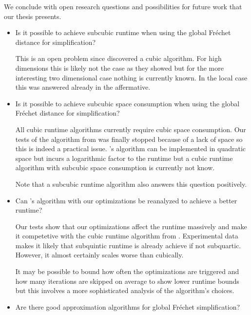 We conclude with open research questions and possibilities for future work that our thesis presents.

\begin{itemize}
  \item Is it possible to achieve subcubic runtime when using the global Fréchet distance for simplification?

	This is an open problem since \citeauthor{polyline_simplification_has_cubic_complexity_bringmannetal} discovered a cubic algorithm. For high dimensions this is likely not the case as they showed but for the more interesting two dimensional case nothing is currently known. In the local case this was answered already in the affermative.

	\item Is it possible to achieve subcubic space consumption when using the global Fréchet distance for simplification?

	All cubic runtime algorithms currently require cubic space consumption. Our tests of the algorithm from \citeauthor{polyline_simplification_has_cubic_complexity_bringmannetal} was finally stopped because of a lack of space so this is indeed a practical issue. \citeauthor{global_curve_simplification}'s algorithm can be implemented in quadratic space but incurs a logarithmic factor to the runtime but a cubic runtime algorithm with subcubic space consumption is currently not know.

	Note that a subcubic runtime algorithm also answers this question positively.

	\item Can \citeauthor{on_optimal_polyline_simplification_using_the_hausdorff_and_frechet_distance}'s algorithm with our optimizations be reanalyzed to achieve a better runtime? 

	Our tests show that our optimizations affect the runtime massively and make it competetive with the cubic runtime algorithm from \citeauthor{polyline_simplification_has_cubic_complexity_bringmannetal}. Experimental data makes it likely that subquintic runtime is already achieve if not subquartic. However, it almost certainly scales worse than cubically. 

	It may be possible to bound how often the optimizations are triggered and how many iterations are skipped on average to show lower runtime bounds but this involves a more sophisticated analysis of the algorithm's choices.

	\item Are there good approximation algorithms for global Fréchet simplification?


\end{itemize}
